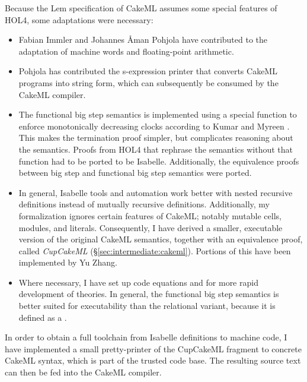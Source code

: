 Because the Lem specification of CakeML assumes some special features of HOL4, some adaptations were necessary:
\begin{itemize}
  \item
    Fabian Immler and Johannes Åman Pohjola have contributed to the adaptation of machine words and floating-point arithmetic.
  \item
    Pohjola has contributed the s-expression printer that converts CakeML programs into string form, which can subsequently be consumed by the CakeML compiler.
  \item
    The functional big step semantics is implemented using a special function to enforce monotonically decreasing clocks according to Kumar and Myreen \cite[§3.2]{kumar2018clocked}.
    This makes the termination proof simpler, but complicates reasoning about the semantics.
    Proofs from HOL4 that rephrase the semantics without that function had to be ported to be Isabelle.
    Additionally, the equivalence proofs between big step and functional big step semantics were ported.
  \item
    In general, Isabelle tools and automation work better with nested recursive definitions instead of mutually recursive definitions.
    Additionally, my formalization ignores certain features of CakeML; notably mutable cells, modules, and literals.
    Consequently, I have derived a smaller, executable version of the original CakeML semantics, together with an equivalence proof, called \emph{CupCakeML} (§\ref{sec:intermediate:cakeml}).
    Portions of this have been implemented by Yu Zhang.
  \item
    Where necessary, I have set up code equations and  for more rapid development of theories.
    In general, the functional big step semantics is better suited for executability than the relational variant, because it is defined as a .
\end{itemize}

\noindent In order to obtain a full toolchain from Isabelle definitions to machine code, I have implemented a small pretty-printer of the CupCakeML fragment to concrete CakeML syntax, which is part of the trusted code base.
The resulting source text can then be fed into the CakeML compiler.